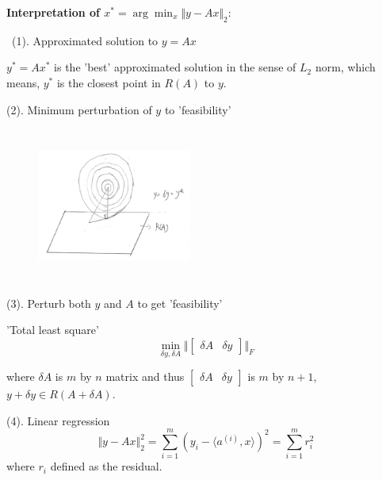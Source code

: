 

%









\textbf{Interpretation of $x^*= \arg \min_x \Vert y-Ax\Vert_2$}:
\vspace{0.3cm}

\quad\ (1). Approximated solution to $y=Ax$

$y^*=Ax^*$ is the 'best' approximated solution in the sense of $L_2$ norm, which means, $y^*$ is the closest point in $R(A)$ to $y$.

(2). Minimum perturbation of $y$ to 'feasibility'

\begin{figure}
	\centering
	\includegraphics[width=2in,height=2in]{figures/ch06/ch06-01.jpg}
\end{figure}

(3). Perturb both $y$ and $A$ to get 'feasibility'

'Total least square'
$$\min_{\delta y,  \delta A} \Vert \begin{bmatrix}
\delta A & \delta y
\end{bmatrix} \Vert_F$$

where $\delta A$ is $m$ by $n$ matrix and thus $\begin{bmatrix}
\delta A & \delta y
\end{bmatrix}$ is $m$ by $n+1$, $y+\delta y\in R(A+\delta A)$.


(4). Linear regression
$$\Vert y-Ax\Vert ^2_2 = \sum_{i=1}^{m} ( y_i - \langle a^{(i)} , x\rangle )^2 = \sum_{i=1}^{m} r_i^2$$
where $r_i$ defined as the residual.

